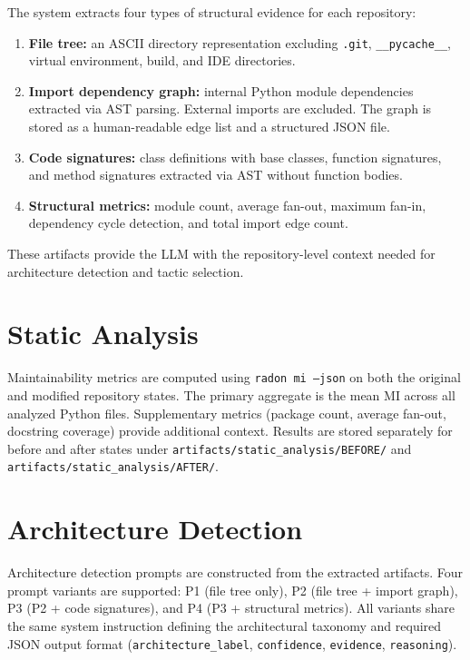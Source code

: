 The system extracts four types of structural evidence for each repository:

\begin{enumerate}
    \item \textbf{File tree:} an ASCII directory representation excluding \texttt{.git}, \texttt{\_\_pycache\_\_}, virtual environment, build, and IDE directories.
    \item \textbf{Import dependency graph:} internal Python module dependencies extracted via AST parsing. External imports are excluded. The graph is stored as a human-readable edge list and a structured JSON file.
    \item \textbf{Code signatures:} class definitions with base classes, function signatures, and method signatures extracted via AST without function bodies.
    \item \textbf{Structural metrics:} module count, average fan-out, maximum fan-in, dependency cycle detection, and total import edge count.
\end{enumerate}

These artifacts provide the LLM with the repository-level context needed for architecture detection and tactic selection.

\section{Static Analysis}

Maintainability metrics are computed using \texttt{radon mi --json} on both the original and modified repository states. The primary aggregate is the mean MI across all analyzed Python files. Supplementary metrics (package count, average fan-out, docstring coverage) provide additional context. Results are stored separately for before and after states under \texttt{artifacts/static\_analysis/BEFORE/} and \texttt{artifacts/static\_analysis/AFTER/}.

\section{Architecture Detection}

Architecture detection prompts are constructed from the extracted artifacts. Four prompt variants are supported: P1 (file tree only), P2 (file tree + import graph), P3 (P2 + code signatures), and P4 (P3 + structural metrics). All variants share the same system instruction defining the architectural taxonomy and required JSON output format (\texttt{architecture\_label}, \texttt{confidence}, \texttt{evidence}, \texttt{reasoning}).

